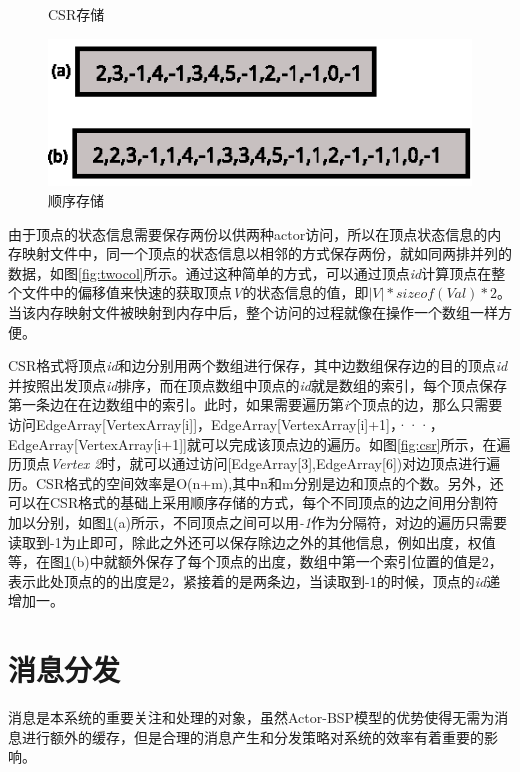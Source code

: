 \begin{figure}[htbp]
\begin{minipage}{0.4\textwidth}
\caption{CSR存储}\label{fig:csr}
\end{minipage}
\begin{minipage}{0.4\textwidth}
\centering
\includegraphics[width=\textwidth]{myfigures/ncsr.eps}
\caption{顺序存储}\label{fig:ncsr}
\end{minipage}

\vspace{\baselineskip}
\end{figure}

由于顶点的状态信息需要保存两份以供两种actor访问，所以在顶点状态信息的内存映射文件中，同一个顶点的状态信息以相邻的方式保存两份，就如同两排并列的数据，如图\ref{fig:twocol}所示。通过这种简单的方式，可以通过顶点\textit{id}计算顶点在整个文件中的偏移值来快速的获取顶点\textit{V}的状态信息的值，即$|V| * sizeof(Val)*2$。当该内存映射文件被映射到内存中后，整个访问的过程就像在操作一个数组一样方便。

CSR格式将顶点\textit{id}和边分别用两个数组进行保存，其中边数组保存边的目的顶点\textit{id}并按照出发顶点\textit{id}排序，而在顶点数组中顶点的\textit{id}就是数组的索引，每个顶点保存第一条边在在边数组中的索引。此时，如果需要遍历第\textit{i}个顶点的边，那么只需要访问EdgeArray[VertexArray[i]]，EdgeArray[VertexArray[i]+1]，···，EdgeArray[VertexArray[i+1]]就可以完成该顶点边的遍历。如图\ref{fig:csr}所示，在遍历顶点\textit{Vertex 2}时，就可以通过访问[EdgeArray[3],EdgeArray[6])对边顶点进行遍历。CSR格式的空间效率是O(n+m),其中n和m分别是边和顶点的个数。另外，还可以在CSR格式的基础上采用顺序存储的方式，每个不同顶点的边之间用分割符加以分别，如图\ref{fig:ncsr}(a)所示，不同顶点之间可以用\textit{-1}作为分隔符，对边的遍历只需要读取到-1为止即可，除此之外还可以保存除边之外的其他信息，例如出度，权值等，在图\ref{fig:ncsr}(b)中就额外保存了每个顶点的出度，数组中第一个索引位置的值是2，表示此处顶点的的出度是2，紧接着的是两条边，当读取到-1的时候，顶点的\textit{id}递增加一。

\section{消息分发}
消息是本系统的重要关注和处理的对象，虽然Actor-BSP模型的优势使得无需为消息进行额外的缓存，但是合理的消息产生和分发策略对系统的效率有着重要的影响。

